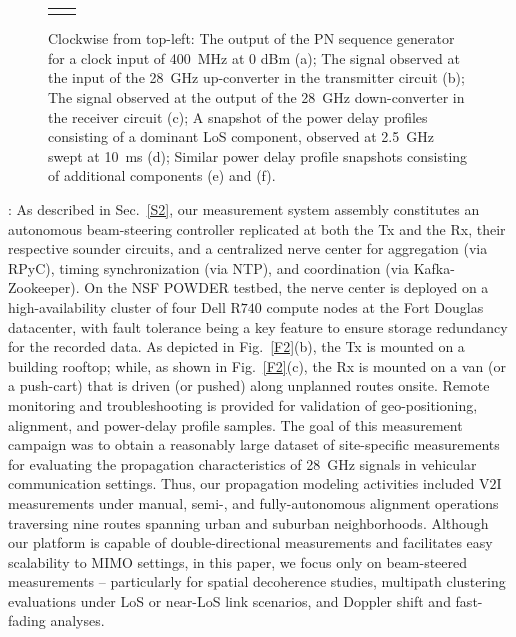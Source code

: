 \documentclass[12pt, draftcls, onecolumn]{IEEEtran}
\begin{document}
\begin{figure}[t]
\begin{tabular}{cc}
\begin{minipage}{0.5\linewidth}
        \end{minipage}
    \end{tabular}
    \caption{Clockwise from top-left: The output of the PN sequence generator for a clock input of \SI{400}{\mega\hertz} at $0$ dBm (a); The signal observed at the input of the \SI{28}{\giga\hertz} up-converter in the transmitter circuit (b); The signal observed at the output of the \SI{28}{\giga\hertz} down-converter in the receiver circuit (c); A snapshot of the power delay profiles consisting of a dominant LoS component, observed at \SI{2.5}{\giga\hertz} swept at \SI{10}{\milli\second} (d); Similar power delay profile snapshots consisting of additional components (e) and (f).}
    \label{F3}
\end{figure}

: As described in Sec.~\ref{S2}, our measurement system assembly constitutes an autonomous beam-steering controller replicated at both the Tx and the Rx, their respective sounder circuits, and a centralized nerve center for aggregation (via RPyC), timing synchronization (via NTP), and coordination (via Kafka-Zookeeper). On the NSF POWDER testbed, the nerve center is deployed on a high-availability cluster of four Dell R$740$ compute nodes at the Fort Douglas datacenter, with fault tolerance being a key feature to ensure storage redundancy for the recorded data. As depicted in Fig.~\ref{F2}(b), the Tx is mounted on a building rooftop; while, as shown in Fig.~\ref{F2}(c), the Rx is mounted on a van (or a push-cart) that is driven (or pushed) along unplanned routes onsite. Remote monitoring and troubleshooting is provided for validation of geo-positioning, alignment, and power-delay profile samples. The goal of this measurement campaign was to obtain a reasonably large dataset of site-specific measurements for evaluating the propagation characteristics of \SI{28}{\giga\hertz} signals in vehicular communication settings. Thus, our propagation modeling activities included V$2$I measurements under manual, semi-, and fully-autonomous alignment operations traversing nine routes spanning urban and suburban neighborhoods. Although our platform is capable of double-directional measurements and facilitates easy scalability to MIMO settings, in this paper, we focus only on beam-steered measurements -- particularly for spatial decoherence studies, multipath clustering evaluations under LoS or near-LoS link scenarios, and Doppler shift and fast-fading analyses. 
\end{document}
